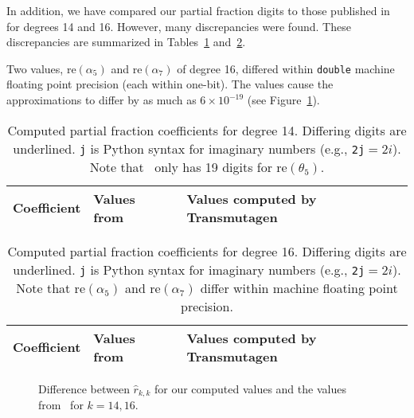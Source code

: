 In addition, we have compared our partial fraction digits to those published
in~\cite{pusa2012correction} for degrees 14 and 16. However, many
discrepancies were found. These discrepancies are summarized in
Tables~\ref{table:pusa-degree-14} and~\ref{table:pusa-degree-16}.

Two values, $\mathrm{re}(\alpha_5)$ and $\mathrm{re}(\alpha_7)$ of degree 16,
differed within \texttt{double} machine floating point precision (each within
one-bit). The values cause the approximations to differ by as much as
$6\times10^{-19}$ (see Figure~\ref{fig:pusa-differences}).

\setul{}{1pt}

\begin{table}[h!]
\centering
\begin{tabular}{ r b{1.8in} b{1.8in} }
Coefficient & Values from~\cite{pusa2012correction} & Values computed by Transmutagen \\
\midrule

\bottomrule
\end{tabular}
\caption{Computed partial fraction coefficients for degree 14. Differing
  digits are underlined. \texttt{j} is Python syntax for imaginary numbers
  (e.g., \texttt{2j}$=2i$). Note that~ only has 19
  digits for $\mathrm{re}(\theta_5)$.}
\label{table:pusa-degree-14}
\end{table}

\begin{table}[h!]
\centering
\begin{tabular}{ r b{1.8in} b{1.8in} }
Coefficient & Values from~\cite{pusa2012correction} & Values computed by Transmutagen \\
\midrule

\bottomrule
\end{tabular}
\caption{Computed partial fraction coefficients for degree 16. Differing
  digits are underlined. \texttt{j} is Python syntax for imaginary numbers
  (e.g., \texttt{2j}$=2i$). Note that $\mathrm{re}(\alpha_5)$ and
  $\mathrm{re}(\alpha_7)$ differ within machine floating point
  precision.}
\label{table:pusa-degree-16}
\end{table}

\begin{figure}[!ht]
\centering
\resizebox{0.9\textwidth}{!}{}
\caption{Difference between $\hat{r}_{k,k}$ for our computed values and the
  values from~ for $k=14,16$.}
\label{fig:pusa-differences}
\end{figure}

